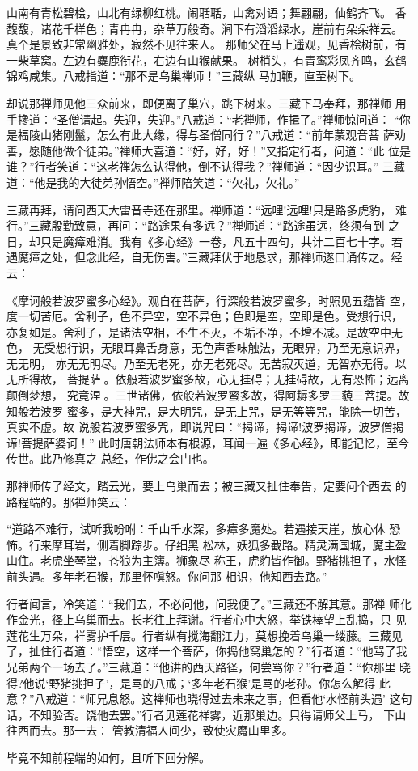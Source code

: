 山南有青松碧桧，山北有绿柳红桃。闹聒聒，山禽对语；舞翩翩，仙鹤齐飞。
香馥馥，诸花千样色；青冉冉，杂草万般奇。涧下有滔滔绿水，崖前有朵朵祥云。
真个是景致非常幽雅处，寂然不见往来人。
那师父在马上遥观，见香桧树前，有一柴草窝。左边有麋鹿衔花，右边有山猴献果。
树梢头，有青鸾彩凤齐鸣，玄鹤锦鸡咸集。八戒指道：“那不是乌巢禅师！”三藏纵
马加鞭，直至树下。

却说那禅师见他三众前来，即便离了巢穴，跳下树来。三藏下马奉拜，那禅师
用手搀道：“圣僧请起。失迎，失迎。”八戒道：“老禅师，作揖了。”禅师惊问道：
“你是福陵山猪刚鬣，怎么有此大缘，得与圣僧同行？”八戒道：“前年蒙观音菩
萨劝善，愿随他做个徒弟。”禅师大喜道：“好，好，好！”又指定行者，问道：“此
位是谁？”行者笑道：“这老禅怎么认得他，倒不认得我？”禅师道：“因少识耳。”
三藏道：“他是我的大徒弟孙悟空。”禅师陪笑道：“欠礼，欠礼。”

三藏再拜，请问西天大雷音寺还在那里。禅师道：“远哩!远哩!只是路多虎豹，
难行。”三藏殷勤致意，再问：“路途果有多远？”禅师道：“路途虽远，终须有到
之日，却只是魔瘴难消。我有《多心经》一卷，凡五十四句，共计二百七十字。若
遇魔瘴之处，但念此经，自无伤害。”三藏拜伏于地恳求，那禅师遂口诵传之。经
云：

《摩诃般若波罗蜜多心经》。观自在菩萨，行深般若波罗蜜多，时照见五蕴皆
空，度一切苦厄。舍利子，色不异空，空不异色；色即是空，空即是色。受想行识，
亦复如是。舍利子，是诸法空相，不生不灭，不垢不净，不增不减。是故空中无色，
无受想行识，无眼耳鼻舌身意，无色声香味触法，无眼界，乃至无意识界，无无明，
亦无无明尽。乃至无老死，亦无老死尽。无苦寂灭道，无智亦无得。以无所得故，
菩提萨。依般若波罗蜜多故，心无挂碍；无挂碍故，无有恐怖；远离颠倒梦想，
究竟涅。三世诸佛，依般若波罗蜜多故，得阿耨多罗三藐三菩提。故知般若波罗
蜜多，是大神咒，是大明咒，是无上咒，是无等等咒，能除一切苦，真实不虚。故
说般若波罗蜜多咒，即说咒曰：“揭谛，揭谛!波罗揭谛，波罗僧揭谛!菩提萨婆诃！”
此时唐朝法师本有根源，耳闻一遍《多心经》，即能记忆，至今传世。此乃修真之
总经，作佛之会门也。

那禅师传了经文，踏云光，要上乌巢而去；被三藏又扯住奉告，定要问个西去
的路程端的。那禅师笑云：

“道路不难行，试听我吩咐：千山千水深，多瘴多魔处。若遇接天崖，放心休
恐怖。行来摩耳岩，侧着脚踪步。仔细黑
松林，妖狐多截路。精灵满国城，魔主盈山住。老虎坐琴堂，苍狼为主簿。狮象尽
称王，虎豹皆作御。野猪挑担子，水怪前头遇。多年老石猴，那里怀嗔怒。你问那
相识，他知西去路。”

行者闻言，冷笑道：“我们去，不必问他，问我便了。”三藏还不解其意。那禅
师化作金光，径上乌巢而去。长老往上拜谢。行者心中大怒，举铁棒望上乱捣，只
见莲花生万朵，祥雾护千层。行者纵有搅海翻江力，莫想挽着乌巢一缕藤。三藏见
了，扯住行者道：“悟空，这样一个菩萨，你捣他窝巢怎的？”行者道：“他骂了我
兄弟两个一场去了。”三藏道：“他讲的西天路径，何尝骂你？”行者道：“你那里
晓得?他说‘野猪挑担子’，是骂的八戒；‘多年老石猴’是骂的老孙。你怎么解得
此意？”八戒道：“师兄息怒。这禅师也晓得过去未来之事，但看他‘水怪前头遇’
这句话，不知验否。饶他去罢。”行者见莲花祥雾，近那巢边。只得请师父上马，
下山往西而去。那一去：
管教清福人间少，致使灾魔山里多。

毕竟不知前程端的如何，且听下回分解。